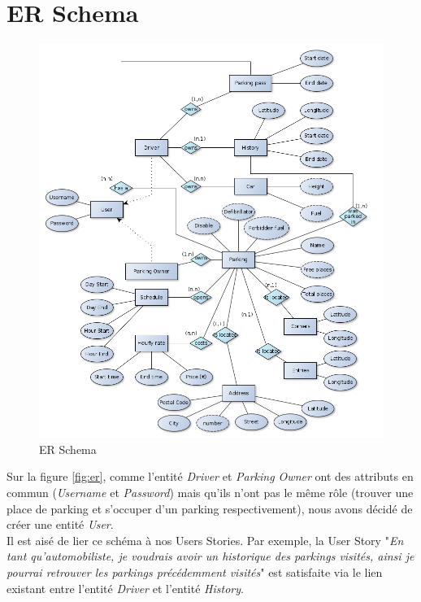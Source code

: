 \documentclass[a4paper,11pt]{article}
\begin{document}
\section{ER Schema}
\begin{figure}[H]
	\begin{center}
		\includegraphics[width=\textwidth]{schema_db_er.png}
		\caption{ER Schema}
		\label{fig:er}
	\end{center}
\end{figure}
Sur la figure \vref{fig:er}, comme l'entité \emph{Driver} et \emph{Parking Owner} ont des attributs en commun (\emph{Username} et \emph{Password}) mais qu'ils n'ont pas le même rôle (trouver une place de parking et s'occuper d'un parking respectivement), nous avons décidé de créer une entité \emph{User}.\\
Il est aisé de lier ce schéma à nos Users Stories. Par exemple, la User Story "\textit{En tant qu’automobiliste, je voudrais avoir un historique des parkings visités, ainsi je pourrai retrouver les parkings précédemment visités}" est satisfaite via le lien existant entre l'entité \emph{Driver} et l'entité \emph{History}.
\end{document}
